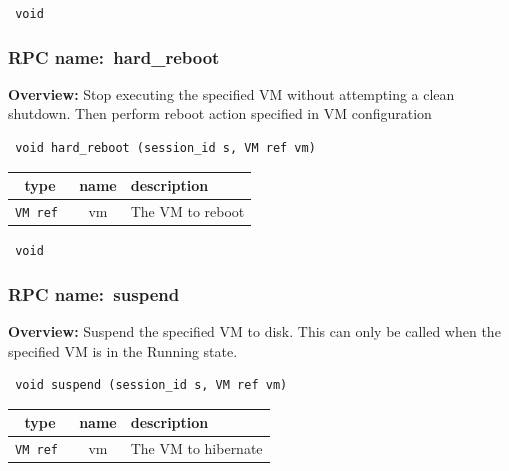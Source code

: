 {\tt 
void
}



\vspace{0.3cm}
\vspace{0.3cm}
\vspace{0.3cm}
\subsubsection{RPC name:~hard\_reboot}

{\bf Overview:} 
Stop executing the specified VM without attempting a clean shutdown. Then perform reboot action specified in VM configuration

\begin{verbatim} void hard_reboot (session_id s, VM ref vm)\end{verbatim}



 
\vspace{0.3cm}
\begin{tabular}{|c|c|p{7cm}|}
 \hline
{\bf type} & {\bf name} & {\bf description} \\ \hline
{\tt VM ref } & vm & The VM to reboot \\ \hline 

\end{tabular}

\vspace{0.3cm}

{\tt 
void
}



\vspace{0.3cm}
\vspace{0.3cm}
\vspace{0.3cm}
\subsubsection{RPC name:~suspend}

{\bf Overview:} 
Suspend the specified VM to disk.  This can only be called when the specified VM is in the Running state.

\begin{verbatim} void suspend (session_id s, VM ref vm)\end{verbatim}



 
\vspace{0.3cm}
\begin{tabular}{|c|c|p{7cm}|}
 \hline
{\bf type} & {\bf name} & {\bf description} \\ \hline
{\tt VM ref } & vm & The VM to hibernate \\ \hline 

\end{tabular}


